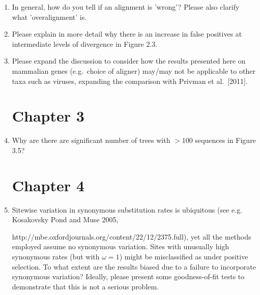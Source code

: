 \begin{enumerate}
{
}

\item{ In general, how do you tell if an alignment is 'wrong'? Please also
clarify what 'overalignment' is.

}

\item{ Please explain in more detail why there is an increase in false
positives at intermediate levels of divergence in Figure 2.3.

}

\item{ Please expand the discussion to consider how the results presented
here on mammalian genes (e.g.\ choice of aligner) may/may not be
applicable to other taxa such as viruses, expanding the comparison
with Privman et al.\ [2011].

}

\section{Chapter 3}

\item{ Why are there are significant number of trees with $>100$ sequences in
Figure 3.5?}

\section{Chapter 4}

\item{ Sitewise variation in
  synonymous substitution rates is ubiquitous (see e.g. Kosakovsky
  Pond and Muse 2005,

  http://mbe.oxfordjournals.org/content/22/12/2375.full), yet all the
  methods employed assume no synonymous variation. Sites with
  unusually high synonymous rates (but with $\omega=1$) might be
  misclassified as under positive selection. To what extent are the
  results biased due to a failure to incorporate synonymous variation?
  Ideally, please present some goodness-of-fit tests to demonstrate
  that this is not a serious problem.}


\end{enumerate}
